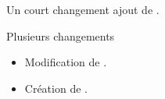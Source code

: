 \begin{doctopic}{Un court changement}
    ajout de .
\end{doctopic}


\begin{doctopic}[ml]{Plusieurs changements}
    \begin{itemize}
        \item Modification de .
        \item Création de .
    \end{itemize}
\end{doctopic}
